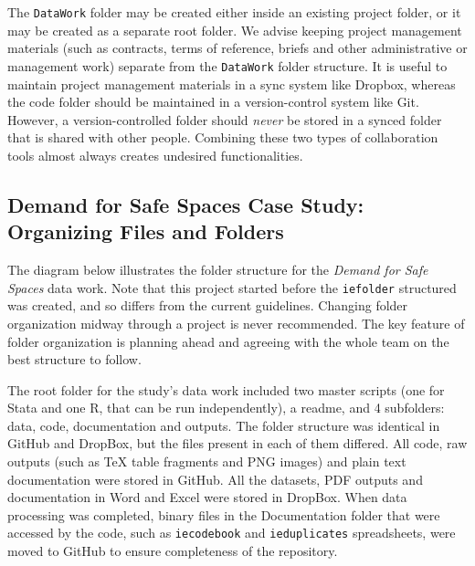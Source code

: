 \documentclass[
]{book}
\begin{document}
The \texttt{DataWork} folder may be created either inside
an existing project folder, or it may be created as a separate root folder.
We advise keeping project management materials
(such as contracts, terms of reference, briefs and other administrative or management work)
separate from the \texttt{DataWork} folder structure.
It is useful to maintain project management materials in a sync system like Dropbox,
whereas the code folder should be maintained in a version-control system like Git.
However, a version-controlled folder should \emph{never}
be stored in a synced folder that is shared with other people.
Combining these two types of collaboration tools
almost always creates undesired functionalities.

\begin{ex}
\hypertarget{demand-for-safe-spaces-case-study-organizing-files-and-folders}{%
\subsection*{Demand for Safe Spaces Case Study: Organizing Files and Folders}\label{demand-for-safe-spaces-case-study-organizing-files-and-folders}}

The diagram below illustrates the folder structure for the \emph{Demand for Safe Spaces} data work. Note that this project started before the \texttt{iefolder} structured was created, and so differs from the current guidelines. Changing folder organization midway through a project is never recommended. The key feature of folder organization is planning ahead and agreeing with the whole team on the best structure to follow.

The root folder for the study's data work included two master scripts (one for Stata and one R, that can be run independently), a readme, and 4 subfolders: data, code, documentation and outputs. The folder structure was identical in GitHub and DropBox, but the files present in each of them differed. All code, raw outputs (such as TeX table fragments and PNG images) and plain text documentation were stored in GitHub. All the datasets, PDF outputs and documentation in Word and Excel were stored in DropBox. When data processing was completed, binary files in the Documentation folder that were accessed by the code, such as \texttt{iecodebook} and \texttt{ieduplicates} spreadsheets, were moved to GitHub to ensure completeness of the repository.


\end{ex}
\end{document}

